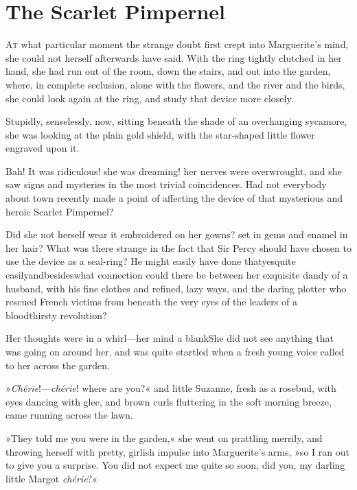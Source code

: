 
\chapter{The Scarlet Pimpernel}
\lettrine[lines=4]{A}{t} what particular moment the strange doubt first crept into Marguerite's mind, she could not herself afterwards have said. With the ring tightly clutched in her hand, she had run out of the room, down the stairs, and out into the garden, where, in complete seclusion, alone with the flowers, and the river and the birds, she could look again at the ring, and study that device more closely.

Stupidly, senselessly, now, sitting beneath the shade of an overhanging sycamore, she was looking at the plain gold shield, with the star-shaped little flower engraved upon it.

Bah! It was ridiculous! she was dreaming! her nerves were overwrought, and she saw signs and mysteries in the most trivial coincidences. Had not everybody about town recently made a point of affecting the device of that mysterious and heroic Scarlet Pimpernel?

Did she not herself wear it embroidered on her gowns? set in gems and enamel in her hair? What was there strange in the fact that Sir Percy should have chosen to use the device as a seal-ring? He might easily have done that\textellipsis \allowbreak  yes\textellipsis \allowbreak  quite easily\textellipsis \allowbreak  and\textellipsis \allowbreak  besides\textellipsis \allowbreak  what connection could there be between her exquisite dandy of a husband, with his fine clothes and refined, lazy ways, and the daring plotter who rescued French victims from beneath the very eyes of the leaders of a bloodthirsty revolution?

Her thoughts were in a whirl—her mind a blank\textellipsis \allowbreak  She did not see anything that was going on around her, and was quite startled when a fresh young voice called to her across the garden.

»\textit{Chérie}!—\textit{chérie}! where are you?« and little Suzanne, fresh as a rosebud, with eyes dancing with glee, and brown curls fluttering in the soft morning breeze, came running across the lawn.

»They told me you were in the garden,« she went on prattling merrily, and throwing herself with pretty, girlish impulse into Marguerite's arms, »so I ran out to give you a surprise. You did not expect me quite so soon, did you, my darling little Margot \textit{chérie}?«

